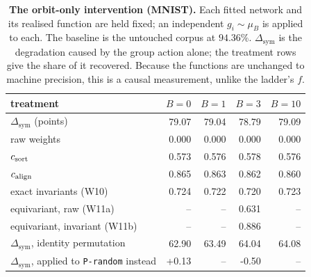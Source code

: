 \begin{table}[t]
\centering\small
\caption{\textbf{The orbit-only intervention (MNIST).} Each fitted network and its realised function are held fixed; an independent $g_i\sim\mu_B$ is applied to each. The baseline is the untouched corpus at $94.36\%$. $\Delta_{\mathrm{sym}}$ is the degradation caused by the group action alone; the treatment rows give the share of it recovered. Because the functions are unchanged to machine precision, this is a causal measurement, unlike the ladder's $f$.}
\label{tab:orbit}
\begin{tabular}{@{}lrrrr@{}}
\toprule
treatment & $B=0$ & $B=1$ & $B=3$ & $B=10$ \\
\midrule
$\Delta_{\mathrm{sym}}$ (points) & 79.07 & 79.04 & 78.79 & 79.09 \\
\midrule
raw weights & 0.000 & 0.000 & 0.000 & 0.000 \\
$c_{\mathrm{sort}}$ & 0.573 & 0.576 & 0.578 & 0.576 \\
$c_{\mathrm{align}}$ & 0.865 & 0.863 & 0.862 & 0.860 \\
exact invariants (W10) & 0.724 & 0.722 & 0.720 & 0.723 \\
equivariant, raw (W11a) & -- & -- & 0.631 & -- \\
equivariant, invariant (W11b) & -- & -- & 0.886 & -- \\
\midrule
$\Delta_{\mathrm{sym}}$, identity permutation & 62.90 & 63.49 & 64.04 & 64.08 \\
$\Delta_{\mathrm{sym}}$, applied to \texttt{P-random} instead & +0.13 & -- & -0.50 & -- \\
\bottomrule
\end{tabular}
\end{table}
